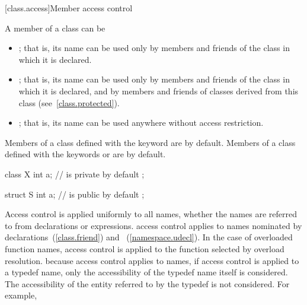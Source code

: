 [class.access]{Member access control}%


\pnum
A member of a class can be
\begin{itemize}
\item
{}%
;
that is, its name can be used only by members and friends
of the class in which it is declared.
\item
{}%
;
that is, its name can be used only by members and friends
of the class in which it is declared, and by members and friends of classes
derived from this class (see~\ref{class.protected}).
\item
{}%
;
that is, its name can be used anywhere without access restriction.
\end{itemize}

\pnum
{}%
%
%
Members of a class defined with the keyword
are
by default.
Members of a class defined with the keywords
or
are
by default.
\enterexample

\begin{codeblock}
class X {
    int a;			//  is private by default
};

struct S {
    int a;			//  is public by default
};
\end{codeblock}
\exitexampleb

\pnum
Access control is applied uniformly to all names, whether the names are
referred to from declarations or expressions.
\enternote
access control applies to names nominated by
declarations~(\ref{class.friend}) and
~(\ref{namespace.udecl}).
\exitnote
In the case of overloaded function names, access control is applied to
the function selected by overload resolution.
\enternote
because access control applies to names, if access control is applied to a
typedef name, only the accessibility of the typedef name itself is considered.
The accessibility of the entity referred to by the typedef is not considered.
For example,


